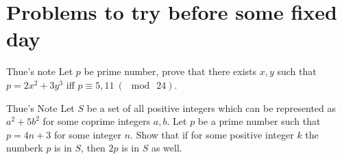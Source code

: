 \section{Problems to try before some fixed day}

\prob{}
{Thue's note}{}{
    Let $p$ be prime number, prove that there exists $x, y$ such that
    $p=2x^2+3y^3$ iff $p\equiv 5, 11 \ (\mod\ 24)$.   
}

\prob{}
{Thue's Note}{}{
    Let $S$ be a set of all positive integers which can be represented as
    $a^2+ 5b^2$ for some coprime integers $a,b$. Let $p$ be a prime number
    such that $p= 4n+ 3$ for some integer $n$. Show that if for some positive
    integer $k$ the numberk $p$ is in $S$, then $2p$ is in $S$ as well.
}
